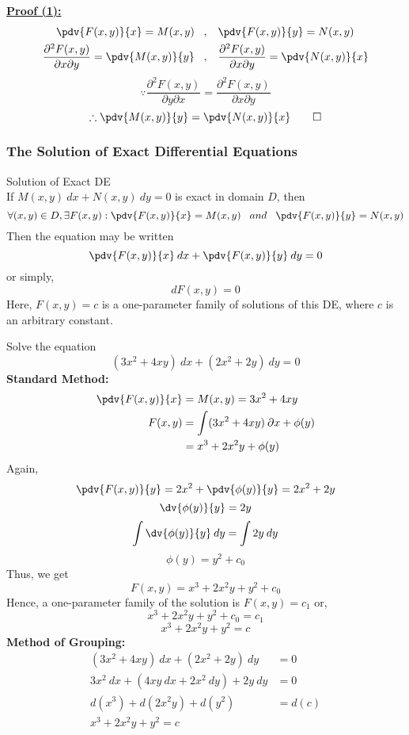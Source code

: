 \underline{\textbf{Proof (1):}}
\begin{align*}
    \pdv{F(x,y)}{x} = M(x,y) \;\;\;&,\;\;\; \pdv{F(x,y)}{y} = N(x,y)  \\
    \frac{\partial^2 F(x,y)}{\partial x \partial y} = \pdv{M(x,y)}{y} \;\;\;&,\;\;\; \frac{\partial^2 F(x,y)}{\partial x \partial y} = \pdv{N(x,y)}{x}
\end{align*}
\[
    \because \frac{\partial^2 F(x,y)}{\partial y \partial x} = \frac{\partial^2 F(x,y)}{\partial x \partial y}
\] \[
    \therefore \pdv{M(x,y)}{y} = \pdv{N(x,y)}{x} \qed
\]

\vspace{20pt}
\subsubsection{The Solution of Exact Differential Equations}

\begin{theorem}{Solution of Exact DE}{}
    \\If $M(x,y) \: d{x} + N(x,y) \: d{y} = 0$ is exact in domain $D$, then
    \[
        \forall(x,y)\in D, \exists F(x,y) : \pdv{F(x,y)}{x} = M(x,y) \;\;\;and\;\;\;
        \pdv{F(x,y)}{y} = N(x,y)
    \]
    Then the equation may be written \[
        \pdv{F(x,y)}{x} \: d{x} + \pdv{F(x,y)}{y} \: d{y} = 0
    \] or simply, \[
        dF(x,y) = 0
    \]
    Here, $F(x,y) = c$ is a one-parameter family of solutions of this DE, where $c$ is an arbitrary constant.
\end{theorem}

\begin{example}{Solve the equation \[
        (3x^2 + 4xy) \: d{x} + (2x^2 + 2y) \: d{y} = 0
\]}{}
    \textbf{Standard Method:}
    \begin{align*}
        \pdv{F(x,y)}{x} &= M(x,y) = 3x^2 + 4xy \\
        F(x,y) &= \int (3x^2 + 4xy) \: \partial{x} + \phi(y) \\
        &= x^3 + 2x^2y + \phi(y) \\
    \end{align*}
    Again, \[
        \pdv{F(x,y)}{y} = 2x^2 + \pdv{\phi(y)}{y} = 2x^2 + 2y
    \] \[
        \dv{\phi(y)}{y} = 2y
    \] \[
    \int \dv{\phi(y)}{y} \: d{y} = \int 2y \: d{y}
    \] \[
        \phi(y) = y^2 + c_0
    \]
    Thus, we get \[
        F(x,y) = x^3 + 2x^2y + y^2 + c_0
    \] Hence, a one-parameter family of the solution is $F(x,y) = c_1$ or, \[
        x^3 + 2x^2y + y^2 + c_0 = c_1
    \]\[
        \boxed{x^3 + 2x^2y + y^2 = c}
    \]
    \textbf{Method of Grouping:}
    \begin{align*}
        (3x^2 + 4xy) \: d{x} + (2x^2 + 2y) \: d{y} &= 0 \\
        3x^2 \: d{x} + (4xy \: d{x} + 2x^2 \: d{y}) + 2y \: d{y} &= 0 \\
        d(x^3) + d(2x^2y) + d(y^2) &= d(c) \\
        \boxed{x^3 + 2x^2y + y^2 = c}
    \end{align*}
\end{example}

